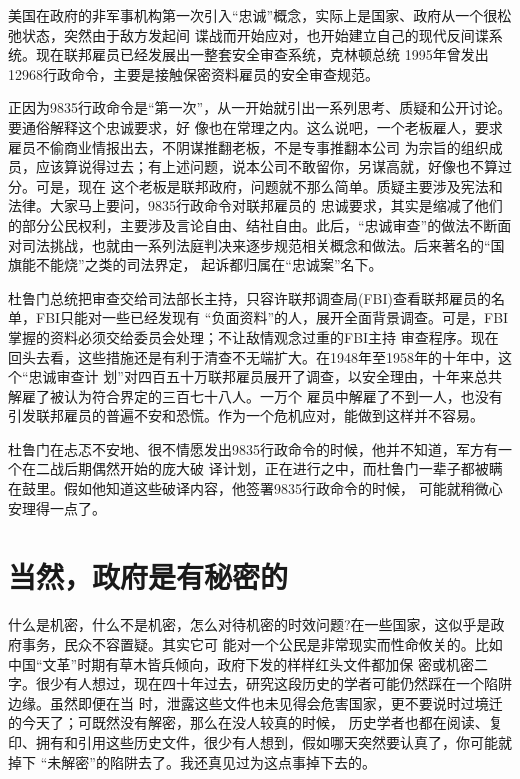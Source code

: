 \documentclass[10pt]{article}
\begin{document}
{美国在政府的非军事机构第一次引入``忠诚''概念，实际上是国家、政府从一个很松弛状态，突然由于敌方发起间
谍战而开始应对，也开始建立自己的现代反间谍系统。现在联邦雇员已经发展出一整套安全审查系统，克林顿总统
1995年曾发出12968行政命令，主要是接触保密资料雇员的安全审查规范。

正因为9835行政命令是``第一次''，从一开始就引出一系列思考、质疑和公开讨论。要通俗解释这个忠诚要求，好
像也在常理之内。这么说吧，一个老板雇人，要求雇员不偷商业情报出去，不阴谋推翻老板，不是专事推翻本公司
为宗旨的组织成员，应该算说得过去；有上述问题，说本公司不敢留你，另谋高就，好像也不算过分。可是，现在
这个老板是联邦政府，问题就不那么简单。质疑主要涉及宪法和法律。大家马上要问，9835行政命令对联邦雇员的
忠诚要求，其实是缩减了他们的部分公民权利，主要涉及言论自由、结社自由。此后，``忠诚审查''的做法不断面
对司法挑战，也就由一系列法庭判决来逐步规范相关概念和做法。后来著名的``国旗能不能烧''之类的司法界定，
起诉都归属在``忠诚案''名下。

杜鲁门总统把审查交给司法部长主持，只容许联邦调查局(FBI)查看联邦雇员的名单，FBI只能对一些已经发现有
``负面资料''的人，展开全面背景调查。可是，FBI掌握的资料必须交给委员会处理；不让敌情观念过重的FBI主持
审查程序。现在回头去看，这些措施还是有利于清查不无端扩大。在1948年至1958年的十年中，这个``忠诚审查计
划''对四百五十万联邦雇员展开了调查，以安全理由，十年来总共解雇了被认为符合界定的三百七十八人。一万个
雇员中解雇了不到一人，也没有引发联邦雇员的普遍不安和恐慌。作为一个危机应对，能做到这样并不容易。

杜鲁门在忐忑不安地、很不情愿发出9835行政命令的时候，他并不知道，军方有一个在二战后期偶然开始的庞大破
译计划，正在进行之中，而杜鲁门一辈子都被瞒在鼓里。假如他知道这些破译内容，他签署9835行政命令的时候，
可能就稍微心安理得一点了。

\pagebreak
\section{当然，政府是有秘密的}

什么是机密，什么不是机密，怎么对待机密的时效问题?在一些国家，这似乎是政府事务，民众不容置疑。其实它可
能对一个公民是非常现实而性命攸关的。比如中国``文革''时期有草木皆兵倾向，政府下发的样样红头文件都加保
密或机密二字。很少有人想过，现在四十年过去，研究这段历史的学者可能仍然踩在一个陷阱边缘。虽然即便在当
时，泄露这些文件也未见得会危害国家，更不要说时过境迁的今天了；可既然没有解密，那么在没人较真的时候，
历史学者也都在阅读、复印、拥有和引用这些历史文件，很少有人想到，假如哪天突然要认真了，你可能就掉下
``未解密''的陷阱去了。我还真见过为这点事掉下去的。

}
\end{document}
